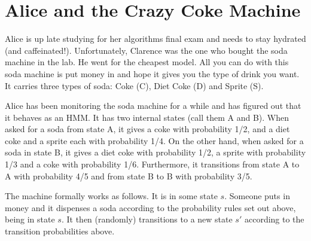 \documentclass[fleqn]{hermans-hw}
\begin{document}
\section{Alice and the Crazy Coke Machine}
\vspace{-0.5cm}
Alice is up late studying for her algorithms final exam and needs to
stay hydrated (and caffeinated!).  Unfortunately, Clarence was the one
who bought the soda machine in the lab.  He went for the cheapest
model.  All you can do with this soda machine is put money in and hope
it gives you the type of drink you want.  It carries three types of
soda: Coke (C), Diet Coke (D) and Sprite (S).

Alice has been monitoring the soda machine for a while and has figured
out that it behaves as an HMM.  It has two internal states (call them
A and B).  When asked for a soda from state A, it gives a coke with
probability 1/2, and a diet coke and a sprite each with probability
1/4.  On the other hand, when asked for a soda in state B, it gives a
diet coke with probability 1/2, a sprite with probability 1/3 and a
coke with probability 1/6.  Furthermore, it transitions from state A
to A with probability 4/5 and from state B to B with probability 3/5.

The machine formally works as follows.  It is in some state $s$.
Someone puts in money and it dispenses a soda according to the
probability rules set out above, being in state $s$.  It then
(randomly) transitions to a new state $s'$ according to the transition
probabilities above.
\end{document}
